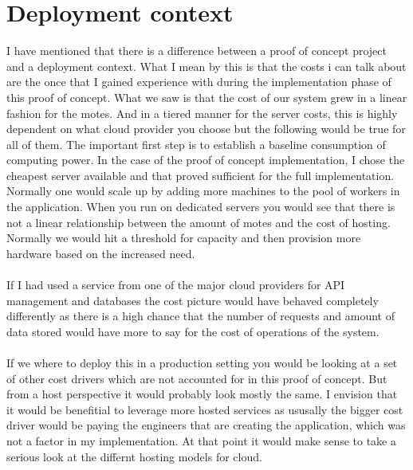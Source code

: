 \documentclass[]{uiophd}
\begin{document}
\section{Deployment context}
I have mentioned that there is a difference between a proof of concept project and a deployment context. What I mean by this is that the costs i can talk about are the once that I gained experience with during the implementation phase of this proof of concept. What we saw is that the cost of our system grew in a linear fashion for the motes. And in a tiered manner for the server costs, this is highly dependent on what cloud provider you choose but the following would be true for all of them. The important first step is to establish a baseline consumption of computing power. In the case of the proof of concept implementation, I chose the cheapest server available and that proved sufficient for the full implementation. Normally one would scale up by adding more machines to the pool of workers in the application. When you run on dedicated servers you would see that there is not a linear relationship between the amount of motes and the cost of hosting. Normally we would hit a threshold for capacity and then provision more hardware based on the increased need.
\\\\
If I had used a service from one of the major cloud providers for API management and databases the cost picture would have behaved completely differently as there is a high chance that the number of requests and amount of data stored would have more to say for the cost of operations of the system.
\\\\
If we where to deploy this in a production setting you would be looking at a set of other cost drivers which are not accounted for in this proof of concept. But from a host perspective it would probably look mostly the same. I envision that it would be benefitial to leverage more hosted services as ususally the bigger cost driver would be paying the engineers that are creating the application, which was not a factor in my implementation. At that point it would make sense to take a serious look at the differnt hosting models for cloud.
\\\\
\end{document}
